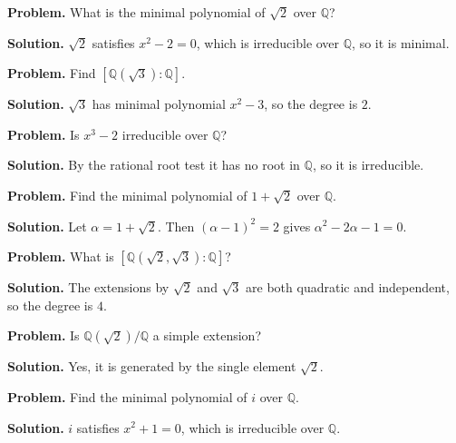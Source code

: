 \begin{example}\label{ex:sec2-1}
\textbf{Problem.} What is the minimal polynomial of $\sqrt{2}$ over $\mathbb{Q}$?

\textbf{Solution.} $\sqrt{2}$ satisfies $x^2-2=0$, which is irreducible over $\mathbb{Q}$, so it is minimal.
\end{example}

\begin{example}\label{ex:sec2-2}
\textbf{Problem.} Find $[\mathbb{Q}(\sqrt{3}):\mathbb{Q}]$.

\textbf{Solution.} $\sqrt{3}$ has minimal polynomial $x^2-3$, so the degree is $2$.
\end{example}

\begin{example}\label{ex:sec2-3}
\textbf{Problem.} Is $x^3-2$ irreducible over $\mathbb{Q}$?

\textbf{Solution.} By the rational root test it has no root in $\mathbb{Q}$, so it is irreducible.
\end{example}

\begin{example}\label{ex:sec2-4}
\textbf{Problem.} Find the minimal polynomial of $1+\sqrt{2}$ over $\mathbb{Q}$.

\textbf{Solution.} Let $\alpha=1+\sqrt{2}$. Then $(\alpha-1)^2=2$ gives $\alpha^2-2\alpha-1=0$.
\end{example}

\begin{example}\label{ex:sec2-5}
\textbf{Problem.} What is $[\mathbb{Q}(\sqrt{2},\sqrt{3}):\mathbb{Q}]$?

\textbf{Solution.} The extensions by $\sqrt{2}$ and $\sqrt{3}$ are both quadratic and independent, so the degree is $4$.
\end{example}

\begin{example}\label{ex:sec2-6}
\textbf{Problem.} Is $\mathbb{Q}(\sqrt{2})/\mathbb{Q}$ a simple extension?

\textbf{Solution.} Yes, it is generated by the single element $\sqrt{2}$.
\end{example}

\begin{example}\label{ex:sec2-7}
\textbf{Problem.} Find the minimal polynomial of $i$ over $\mathbb{Q}$.

\textbf{Solution.} $i$ satisfies $x^2+1=0$, which is irreducible over $\mathbb{Q}$.
\end{example}

